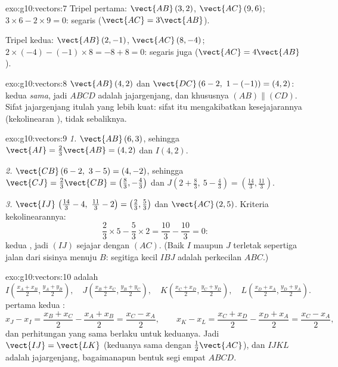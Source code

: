 \begin{solution}{exo:g10:vectors:7}
Tripel pertama: $\vect{AB}\,(3, 2)$, $\vect{AC}\,(9, 6)$;
$3 \times 6 - 2 \times 9 = 0$: segaris ($\vect{AC} = 3\vect{AB}$).

Tripel kedua: $\vect{AB}\,(2, -1)$, $\vect{AC}\,(8, -4)$;
$2 \times (-4) - (-1) \times 8 = -8 + 8 = 0$: segaris juga
($\vect{AC} = 4\vect{AB}$).
\end{solution}

\begin{solution}{exo:g10:vectors:8}
$\vect{AB}\,(4, 2)$ dan $\vect{DC}\,(6-2,\ 1-(-1)) = (4, 2)$: kedua
 \emph{sama}, jadi $ABCD$ adalah jajargenjang, dan khususnya
$(AB) \parallel (CD)$. Sifat jajargenjang itulah yang lebih kuat: sifat itu
mengakibatkan kesejajarannya (kekolinearan ), tidak sebaliknya.
\end{solution}

\begin{solution}{exo:g10:vectors:9}
\emph{1.} $\vect{AB}\,(6, 3)$, sehingga
$\vect{AI} = \frac23\vect{AB} = (4, 2)$ dan $I(4, 2)$.

\emph{2.} $\vect{CB}\,(6-2,\ 3-5) = (4, -2)$, sehingga
$\vect{CJ} = \frac23\vect{CB} = \left(\frac83, -\frac43\right)$ dan
$J\left(2 + \frac83,\ 5 - \frac43\right) = \left(\frac{14}{3},
\frac{11}{3}\right)$.

\emph{3.} $\vect{IJ}\,\left(\frac{14}{3} - 4,\ \frac{11}{3} - 2\right) =
\left(\frac23, \frac53\right)$ dan $\vect{AC}\,(2, 5)$. Kriteria
kekolinearannya:
\[
\frac23 \times 5 - \frac53 \times 2 = \frac{10}{3} - \frac{10}{3} = 0 :
\]
kedua  , jadi $(IJ)$ sejajar dengan $(AC)$. (Baik $I$
maupun $J$ terletak sepertiga jalan dari sisinya menuju $B$: segitiga
kecil $IBJ$ adalah perkecilan $ABC$.)
\end{solution}

\begin{solution}{exo:g10:vectors:10}
 adalah
\[
I\left(\tfrac{x_A + x_B}{2}, \tfrac{y_A + y_B}{2}\right), \quad
J\left(\tfrac{x_B + x_C}{2}, \tfrac{y_B + y_C}{2}\right), \quad
K\left(\tfrac{x_C + x_D}{2}, \tfrac{y_C + y_D}{2}\right), \quad
L\left(\tfrac{x_D + x_A}{2}, \tfrac{y_D + y_A}{2}\right).
\]
 pertama kedua :
\[
x_J - x_I = \frac{x_B + x_C}{2} - \frac{x_A + x_B}{2}
= \frac{x_C - x_A}{2},
\qquad
x_K - x_L = \frac{x_C + x_D}{2} - \frac{x_D + x_A}{2}
= \frac{x_C - x_A}{2},
\]
dan perhitungan yang sama berlaku untuk  keduanya. Jadi
$\vect{IJ} = \vect{LK}$ (keduanya sama dengan $\frac12\vect{AC}$), dan
$IJKL$ adalah jajargenjang, bagaimanapun bentuk segi empat $ABCD$.
\end{solution}

